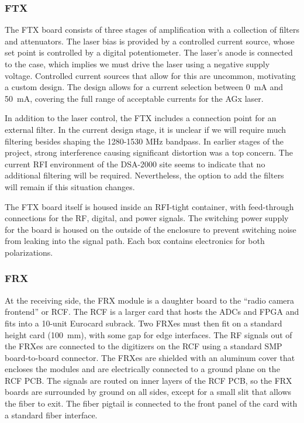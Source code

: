 \subsubsection{FTX}
The FTX board consists of three stages of amplification with a collection of filters and attenuators.
The laser bias is provided by a controlled current source, whose set point is controlled by a digital potentiometer.
The laser's anode is connected to the case, which implies we must drive the laser using a negative supply voltage.
Controlled current sources that allow for this are uncommon, motivating a custom design.
The design allows for a current selection between \qty{0}{\mA} and \qty{50}{\mA}, covering the full range of acceptable currents for the AGx laser.

In addition to the laser control, the FTX includes a connection point for an external filter.
In the current design stage, it is unclear if we will require much filtering besides shaping the 1280-1530 MHz bandpass.
In earlier stages of the project, strong interference causing significant distortion was a top concern.
The current RFI environment of the DSA-2000 site seems to indicate that no additional filtering will be required.
Nevertheless, the option to add the filters will remain if this situation changes.

The FTX board itself is housed inside an RFI-tight container, with feed-through connections for the RF, digital, and power signals.
The switching power supply for the board is housed on the outside of the enclosure to prevent switching noise from leaking into the signal path.
Each box contains electronics for both polarizations.

\subsubsection{FRX}

At the receiving side, the FRX module is a daughter board to the ``radio camera frontend'' or RCF.
The RCF is a larger card that hosts the ADCs and FPGA and fits into a 10-unit Eurocard subrack.
Two FRXes must then fit on a standard height card (\qty{100}{\mm}), with some gap for edge interfaces.
The RF signals out of the FRXes are connected to the digitizers on the RCF using a standard SMP board-to-board connector.
The FRXes are shielded with an aluminum cover that encloses the modules and are electrically connected to a ground plane on the RCF PCB.
The signals are routed on inner layers of the RCF PCB, so the FRX boards are surrounded by ground on all sides, except for a small slit that allows the fiber to exit.
The fiber pigtail is connected to the front panel of the card with a standard fiber interface.


